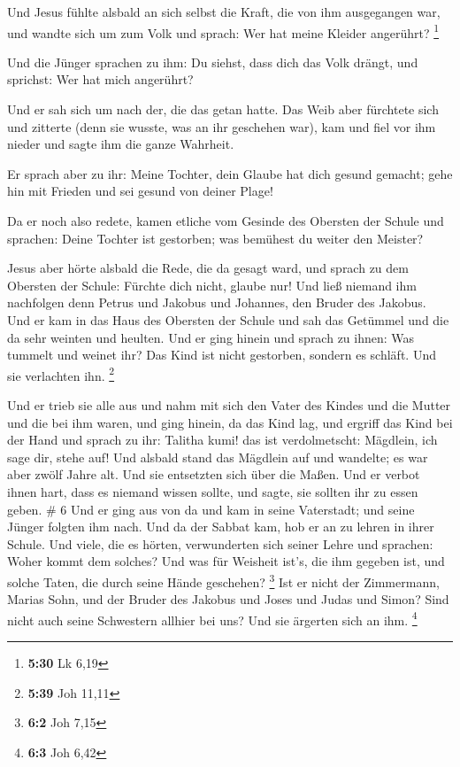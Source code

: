  Und Jesus fühlte alsbald an sich selbst die Kraft, die von
ihm ausgegangen war, und wandte sich um zum Volk und sprach: Wer hat
meine Kleider angerührt? \footnote{\textbf{5:30} Lk 6,19}

 Und die Jünger sprachen zu ihm: Du siehst, dass dich das
Volk drängt, und sprichst: Wer hat mich angerührt?

 Und er sah sich um nach der, die das getan hatte.
 Das Weib aber fürchtete sich und zitterte (denn sie
wusste, was an ihr geschehen war), kam und fiel vor ihm nieder und sagte
ihm die ganze Wahrheit.

 Er sprach aber zu ihr: Meine Tochter, dein Glaube hat dich
gesund gemacht; gehe hin mit Frieden und sei gesund von deiner Plage!

 Da er noch also redete, kamen etliche vom Gesinde des
Obersten der Schule und sprachen: Deine Tochter ist gestorben; was
bemühest du weiter den Meister?

 Jesus aber hörte alsbald die Rede, die da gesagt ward, und
sprach zu dem Obersten der Schule: Fürchte dich nicht, glaube nur!
 Und ließ niemand ihm nachfolgen denn Petrus und Jakobus
und Johannes, den Bruder des Jakobus.  Und er kam in das
Haus des Obersten der Schule und sah das Getümmel und die da sehr
weinten und heulten.  Und er ging hinein und sprach zu
ihnen: Was tummelt und weinet ihr? Das Kind ist nicht gestorben, sondern
es schläft. Und sie verlachten ihn. \footnote{\textbf{5:39} Joh 11,11}

 Und er trieb sie alle aus und nahm mit sich den Vater des
Kindes und die Mutter und die bei ihm waren, und ging hinein, da das
Kind lag,  und ergriff das Kind bei der Hand und sprach zu
ihr: Talitha kumi! das ist verdolmetscht: Mägdlein, ich sage dir, stehe
auf!  Und alsbald stand das Mägdlein auf und wandelte; es
war aber zwölf Jahre alt. Und sie entsetzten sich über die Maßen.
 Und er verbot ihnen hart, dass es niemand wissen sollte,
und sagte, sie sollten ihr zu essen geben. \# 6  Und er ging
aus von da und kam in seine Vaterstadt; und seine Jünger folgten ihm
nach.  Und da der Sabbat kam, hob er an zu lehren in ihrer
Schule. Und viele, die es hörten, verwunderten sich seiner Lehre und
sprachen: Woher kommt dem solches? Und was für Weisheit ist's, die ihm
gegeben ist, und solche Taten, die durch seine Hände geschehen?
\footnote{\textbf{6:2} Joh 7,15}  Ist er nicht der
Zimmermann, Marias Sohn, und der Bruder des Jakobus und Joses und Judas
und Simon? Sind nicht auch seine Schwestern allhier bei uns? Und sie
ärgerten sich an ihm. \footnote{\textbf{6:3} Joh 6,42}

